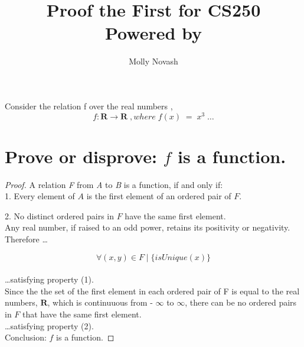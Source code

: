 \documentclass{article}
\author{Molly Novash}
\title{%
\Huge Proof the First for CS250  \\
\normalsize Powered by \LaTeXe}
\begin{document}
\maketitle
Consider the relation f over the real numbers \; ,
\begin{equation}
f: \mathbf{R} \longrightarrow \mathbf{R} \; , where \; f(x) \; = \; x^3 \; \ldots
\end{equation}

\section{Prove or disprove: $f$ is a function.}
\begin{proof} 

A relation 
\emph{F} from 
\emph{A} to 
\emph{B} is a function, if and only if:\\

1. Every element of $A$ is the first element of an ordered pair of $F$.

2. No distinct ordered pairs in $F$ have the same first element.\\

Any real number, if raised to an odd power, retains its positivity or negativity. Therefore \; \ldots

\begin{equation}
\forall (x,y) \in F \; | \; \{isUnique(x)\}
\end{equation} \\


\ldots satisfying property (1).\\

Since the the set of the first element in each ordered pair of F is equal to the real numbers, $\mathbf{R}$, which is continuuous from -
$\infty$
to 
$\infty$, there can be no ordered pairs in $F$ that have the same first element.\\

\ldots satisfying property (2).\\

Conclusion: $f$ is a function.
\end{proof}
\end{document}
